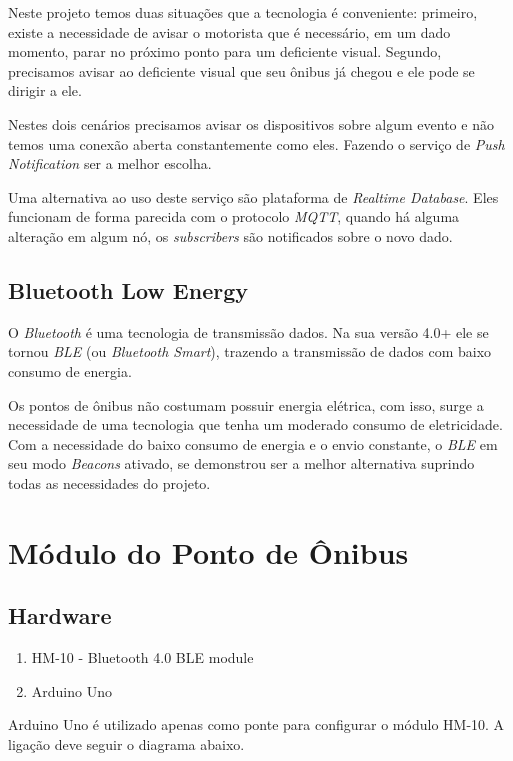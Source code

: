 \documentclass[a4paper, 12pt]{article}
\begin{document}
Neste projeto temos duas situações que a tecnologia é conveniente: primeiro, existe a necessidade de avisar o motorista que é necessário, em um dado momento, parar no próximo ponto para um deficiente visual. Segundo, precisamos avisar ao deficiente visual que seu ônibus já chegou e ele pode se dirigir a ele.

Nestes dois cenários precisamos avisar os dispositivos sobre algum evento e não temos uma conexão aberta constantemente como eles. Fazendo o serviço de \textit{Push Notification} ser a melhor escolha.

Uma alternativa ao uso deste serviço são plataforma de \textit{Realtime Database}. Eles funcionam de forma parecida com o protocolo \textit{MQTT}, quando há alguma alteração em algum nó, os \textit{subscribers} são notificados sobre o novo dado.

\subsection{Bluetooth Low Energy}

O \textit{Bluetooth} é uma tecnologia de transmissão dados. Na sua versão 4.0+ ele se tornou \textit{BLE} (ou \textit{Bluetooth Smart}), trazendo a transmissão de dados com baixo consumo de energia.

Os pontos de ônibus não costumam possuir energia elétrica, com isso, surge a necessidade de uma tecnologia que tenha um moderado consumo de eletricidade. Com a necessidade do baixo consumo de energia e o envio constante, o \textit{BLE} em seu modo \textit{Beacons} ativado, se demonstrou ser a melhor alternativa suprindo todas as necessidades do projeto.

\section{Módulo do Ponto de Ônibus}

\subsection{Hardware}

\begin{enumerate}
\item HM-10 - Bluetooth 4.0 BLE module
\item Arduino Uno
\end{enumerate}

Arduino Uno é utilizado apenas como ponte para configurar o módulo HM-10. A ligação deve seguir o diagrama abaixo.
\end{document}
